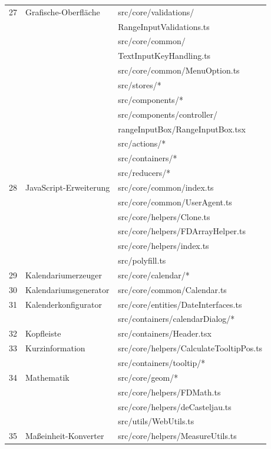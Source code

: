 \begin{longtable}{r@{\hspace{5mm}}lX}
    \hline
    27 & Grafische-Oberfläche & src/core/validations/ \\ & & \> RangeInputValidations.ts \\
        & & src/core/common/  \\ & & \> TextInputKeyHandling.ts \\
        & & src/core/common/MenuOption.ts \\
        & & src/stores/* \\
        & & src/components/* \\
        & & src/components/controller/  \\ & & \> rangeInputBox/RangeInputBox.tsx \\
        & & src/actions/* \\
        & & src/containers/* \\
        & & src/reducers/* \\
    \hline
    28 & JavaScript-Erweiterung & src/core/common/index.ts \\
        & & src/core/common/UserAgent.ts \\
        & & src/core/helpers/Clone.ts \\
        & & src/core/helpers/FDArrayHelper.ts \\
        & & src/core/helpers/index.ts \\
        & & src/polyfill.ts \\
    \hline
    29 & Kalendariumerzeuger & src/core/calendar/* \\
    \hline
    30 & Kalendariumsgenerator & src/core/common/Calendar.ts \\
    \hline
    31 & Kalenderkonfigurator & src/core/entities/DateInterfaces.ts \\
        & & src/containers/calendarDialog/* \\
    \hline
    32 & Kopfleiste & src/containers/Header.tsx \\
    \hline
    33 & Kurzinformation & src/core/helpers/CalculateTooltipPos.ts \\
        & & src/containers/tooltip/* \\
    \hline
    34 & Mathematik & src/core/geom/* \\
        & & src/core/helpers/FDMath.ts \\
        & & src/core/helpers/deCasteljau.ts \\
        & & src/utils/WebUtils.ts \\
    \hline
    35 & Maßeinheit-Konverter & src/core/helpers/MeasureUtils.ts \\

\end{longtable}

